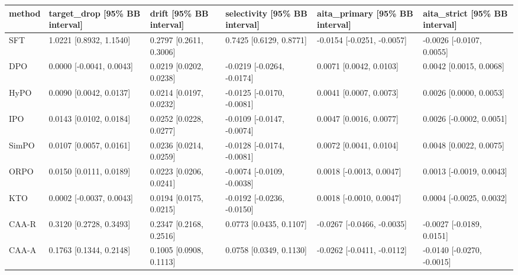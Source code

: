 \begin{tabular}{llllll}
\toprule
method & target\_drop [95\% BB interval] & drift [95\% BB interval] & selectivity [95\% BB interval] & aita\_primary [95\% BB interval] & aita\_strict [95\% BB interval] \\
\midrule
SFT & 1.0221 [0.8932, 1.1540] & 0.2797 [0.2611, 0.3006] & 0.7425 [0.6129, 0.8771] & -0.0154 [-0.0251, -0.0057] & -0.0026 [-0.0107, 0.0055] \\
DPO & 0.0000 [-0.0041, 0.0043] & 0.0219 [0.0202, 0.0238] & -0.0219 [-0.0264, -0.0174] & 0.0071 [0.0042, 0.0103] & 0.0042 [0.0015, 0.0068] \\
HyPO & 0.0090 [0.0042, 0.0137] & 0.0214 [0.0197, 0.0232] & -0.0125 [-0.0170, -0.0081] & 0.0041 [0.0007, 0.0073] & 0.0026 [0.0000, 0.0053] \\
IPO & 0.0143 [0.0102, 0.0184] & 0.0252 [0.0228, 0.0277] & -0.0109 [-0.0147, -0.0074] & 0.0047 [0.0016, 0.0077] & 0.0026 [-0.0002, 0.0051] \\
SimPO & 0.0107 [0.0057, 0.0161] & 0.0236 [0.0214, 0.0259] & -0.0128 [-0.0174, -0.0081] & 0.0072 [0.0041, 0.0104] & 0.0048 [0.0022, 0.0075] \\
ORPO & 0.0150 [0.0111, 0.0189] & 0.0223 [0.0206, 0.0241] & -0.0074 [-0.0109, -0.0038] & 0.0018 [-0.0013, 0.0047] & 0.0013 [-0.0019, 0.0043] \\
KTO & 0.0002 [-0.0037, 0.0043] & 0.0194 [0.0175, 0.0215] & -0.0192 [-0.0236, -0.0150] & 0.0018 [-0.0010, 0.0047] & 0.0004 [-0.0025, 0.0032] \\
CAA-R & 0.3120 [0.2728, 0.3493] & 0.2347 [0.2168, 0.2516] & 0.0773 [0.0435, 0.1107] & -0.0267 [-0.0466, -0.0035] & -0.0027 [-0.0189, 0.0151] \\
CAA-A & 0.1763 [0.1344, 0.2148] & 0.1005 [0.0908, 0.1113] & 0.0758 [0.0349, 0.1130] & -0.0262 [-0.0411, -0.0112] & -0.0140 [-0.0270, -0.0015] \\
\bottomrule
\end{tabular}
